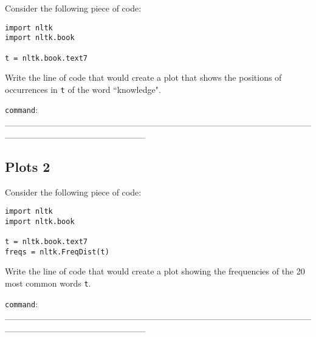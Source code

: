 \documentclass[a4paper,11pt]{scrartcl}
\begin{document}
Consider the following piece of code:

{\singlespacing
\begin{verbatim}
import nltk
import nltk.book

t = nltk.book.text7
\end{verbatim}
}

Write the line of code that would create a plot that shows the positions of
occurrences in \verb|t| of the word ``knowledge".

\verb|command|: \_\_\_\_\_\_\_\_\_\_\_\_\_\_\_\_\_\_\_\_\_\_\_\_\_\_\_\_\_\_\_\_\_\_\_\_\_\_\_\_\_\_\_\_\_\_\_\_\_\_\_\_\_\_\_\_\_\_\_\_\_\_\_\_\_\_\_\_\_\_


\subsection{Plots 2}

Consider the following piece of code:

{\singlespacing
\begin{verbatim}
import nltk
import nltk.book

t = nltk.book.text7
freqs = nltk.FreqDist(t)
\end{verbatim}
}

Write the line of code that would create a plot showing the frequencies of
the 20 most common words \verb|t|.

\verb|command|: \_\_\_\_\_\_\_\_\_\_\_\_\_\_\_\_\_\_\_\_\_\_\_\_\_\_\_\_\_\_\_\_\_\_\_\_\_\_\_\_\_\_\_\_\_\_\_\_\_\_\_\_\_\_\_\_\_\_\_\_\_\_\_\_\_\_\_\_\_\_
\end{document}
